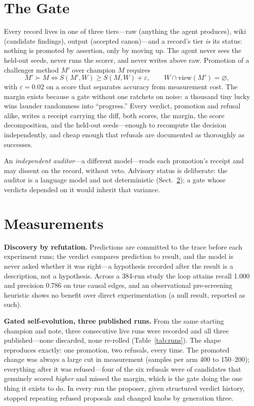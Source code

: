 \documentclass{llncs}
\begin{document}
\section{The Gate}\label{sec:gate}

Every record lives in one of three tiers---raw (anything the agent produces),
wiki (candidate findings), output (accepted canon)---and a record's tier
\emph{is} its status: nothing is promoted by assertion, only by moving up.
The agent never sees the held-out seeds, never runs the scorer, and never
writes above raw. Promotion of a challenger method $M'$ over champion $M$
requires
\begin{equation}
M' \succ M \iff S(M', W) \ge S(M, W) + \varepsilon,
\qquad W \cap \mathrm{view}(M') = \varnothing ,
\end{equation}
with $\varepsilon = 0.02$ on a score that separates accuracy from measurement
cost. The margin exists because a gate without one ratchets on noise: a
thousand tiny lucky wins launder randomness into ``progress.'' Every verdict,
promotion and refusal alike, writes a receipt carrying the diff, both scores,
the margin, the score decomposition, and the held-out seeds---enough to
recompute the decision independently, and cheap enough that refusals are
documented as thoroughly as successes.

An \emph{independent auditor}---a different model---reads each promotion's
receipt and may dissent on the record, without veto. Advisory status is
deliberate: the auditor is a language model and not deterministic
(Sect.~\ref{sec:results}); a gate whose verdicts depended on it would inherit
that variance.

\section{Measurements}\label{sec:results}

\textbf{Discovery by refutation.} Predictions are committed to the trace
before each experiment runs; the verdict compares prediction to result, and
the model is never asked whether it was right---a hypothesis recorded after
the result is a description, not a hypothesis. Across a 384-run study the
loop attains recall 1.000 and precision 0.786 on true causal edges, and an
observational pre-screening heuristic shows no benefit over direct
experimentation (a null result, reported as such).

\textbf{Gated self-evolution, three published runs.} From the same starting
champion and note, three consecutive live runs were recorded and all three
published---none discarded, none re-rolled (Table~\ref{tab:runs}). The shape
reproduces exactly: one promotion, two refusals, every time. The promoted
change was always a large cut in measurement (samples per arm 400 to 150--200);
everything after it was refused---four of the six refusals were of candidates
that genuinely scored \emph{higher} and missed the margin, which is the gate
doing the one thing it exists to do. In every run the proposer, given
structured verdict history, stopped repeating refused proposals and changed
knobs by generation three.
\end{document}
